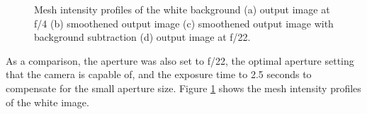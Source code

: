\captionsetup[figure]{width=5in}
\begin{figure}[h!]
\caption{Mesh intensity profiles of the white background (a) output image at f/4 (b) smoothened output image (c) smoothened output image with background subtraction (d) output image at f/22. }
\label{fig:mesh}
\end{figure}





As a comparison, the aperture was also set to f/22, the optimal aperture setting that the camera is capable of, and the exposure time to 2.5 seconds to compensate for the small aperture size. 
Figure \ref{fig:mesh} shows the mesh intensity profiles of the white image. 
